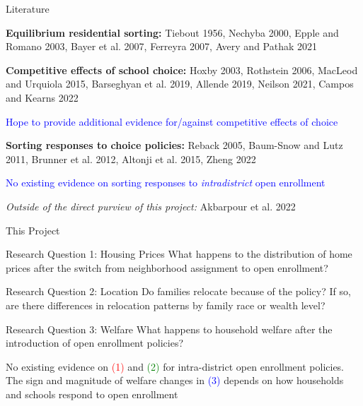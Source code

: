 \documentclass[notes,11pt, aspectratio=169]{beamer}
\newenvironment{wideitemize}{\itemize\addtolength{\itemsep}{10pt}}{\enditemize}
\begin{document}
\begin{frame}{Literature}
\begin{wideitemize}
\item \textbf{Equilibrium residential sorting:} Tiebout 1956, Nechyba 2000, Epple and Romano 2003, Bayer et al. 2007, Ferreyra 2007, Avery and Pathak 2021
\item \textbf{Competitive effects of school choice:} Hoxby 2003, Rothstein 2006, MacLeod and Urquiola 2015, Barseghyan et al. 2019, Allende 2019, Neilson 2021, Campos and Kearns 2022
\begin{wideitemize}
    \item \textcolor{blue}{Hope to provide additional evidence for/against competitive effects of choice}
\end{wideitemize}
\item \textbf{Sorting responses to choice policies:} Reback 2005, Baum-Snow and Lutz 2011, Brunner et al. 2012, Altonji et al. 2015, Zheng 2022
\begin{wideitemize}
    \item \textcolor{blue}{No existing evidence on sorting responses to \textit{intradistrict} open enrollment}
\end{wideitemize}
\item \textit{Outside of the direct purview of this project:} Akbarpour et al. 2022
\end{wideitemize}
\end{frame}

\begin{frame}{This Project}
\begin{alertblock}{Research Question 1: Housing Prices}
  What happens to the distribution of home prices after the switch from neighborhood assignment to open enrollment?
\end{alertblock}
\begin{exampleblock}{Research Question 2: Location}
  Do families relocate because of the policy? If so, are there differences in relocation patterns by family race or wealth level?
\end{exampleblock}
\begin{block}{Research Question 3: Welfare}
  What happens to household welfare after the introduction of open enrollment policies?
\end{block}
\medskip 
\begin{wideitemize}
    \item No existing evidence on \textcolor{red}{(1)} and \textcolor{green}{(2)} for intra-district open enrollment policies. The sign and magnitude of welfare changes in \textcolor{blue}{(3)} depends on how households and schools respond to open enrollment
\end{wideitemize}
\end{frame}
\end{document}
